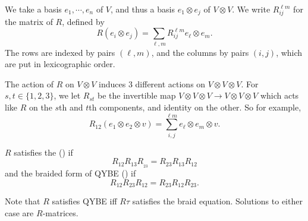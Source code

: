 \documentclass[a4paper]{article}
\begin{document}
We take a basis $e_1, \cdots, e_n$ of $V$, and thus a basis $e_1 \otimes e_j$ of $V \otimes V$. We write $R_{ij}^{\ell m}$ for the matrix of $R$, defined by
\[
  R(e_i \otimes e_j) = \sum_{\ell, m} R_{ij}^{\ell m} e_\ell \otimes e_m.
\]
The rows are indexed by pairs $(\ell, m)$, and the columns by pairs $(i, j)$, which are put in lexicographic order.

The action of $R$ on $V \otimes V$ induces 3 different actions on $V \otimes V \otimes V$. For $s, t \in \{1, 2, 3\}$, we let $R_{st}$ be the invertible map $V \otimes V \otimes V \to V \otimes V \otimes V$ which acts like $R$ on the $s$th and $t$th components, and identity on the other. So for example,
\[
  R_{12} (e_1 \otimes e_2 \otimes v) = \sum^{\ell m}_{i, j} e_{\ell} \otimes e_m \otimes v.
\]
\begin{defi}
  $R$ satisfies the  () if
  \[
   R_{12} R_{13} R_{_23} = R_{23} R_{13} R_{12}
  \]
  and the braided form of QYBE () if
  \[
    R_{12} R_{23} R_{12} = R_{23} R_{12} R_{23}.
  \]
\end{defi}
Note that $R$ satisfies QYBE iff $R\tau$ satisfies the braid equation. Solutions to either case are $R$-matrices.
\end{document}
